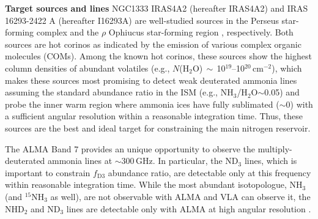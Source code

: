 \documentclass[12pt,a4paper]{article}  %
\newcommand{\ammonia}{NH$_3$\xspace}
\begin{document}



\medskip
\noindent \textbf{Target sources and lines} \quad NGC1333 IRAS4A2 (hereafter IRAS4A2) and IRAS 16293-2422 A (hereafter I16293A) are well-studied sources in the Perseus star-forming complex \citep[$\sim$300\,pc;][]{Zucker18} and the $\rho$ Ophiucus star-forming region \citep[$\sim$140\,pc;][]{Dzib18}, respectively. Both sources are hot corinos as indicated by the emission of various complex organic molecules (COMs).
Among the known hot corinos, these sources show the highest column densities of abundant volatiles (e.g., $N$(H$_2$O)$\,\sim\,$10$^{19}$--10$^{20}$\,cm$^{-2}$), which makes these sources most promising to detect weak deuterated ammonia lines assuming the standard abundance ratio in the ISM (e.g., NH$_3$/H$_2$O$\sim$0.05) and probe the inner warm region where ammonia ices have fully sublimated ($\sim$0) with a sufficient angular resolution within a reasonable integration time. 
Thus, these sources are the best and ideal target for constraining the main nitrogen reservoir.

The ALMA Band 7 provides an unique opportunity to observe the multiply-deuterated ammonia lines at $\sim$300\,GHz. In particular, the ND$_3$ lines, which is important to constrain $f_\mathrm{D3}$ abundance ratio, are detectable only at this frequency within reasonable integration time. While the most abundant isotopologue, \ammonia (and $^{15}$NH$_3$ as well), are not observable with ALMA and VLA can observe it, the NHD$_2$ and ND$_3$ lines are detectable only with ALMA at high angular resolution \citep{Furuya18}.    
\end{document}

